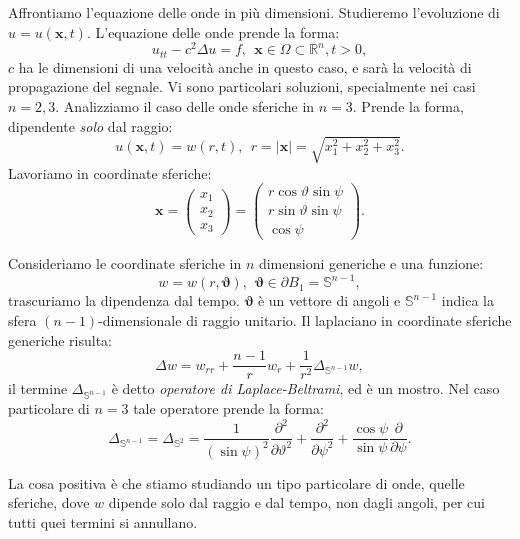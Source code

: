 \documentclass[10pt,a4paper,twoside,openright]{book}
\newcommand{\x}{\mathbf{x}}
\begin{document}
Affrontiamo l'equazione delle onde in più dimensioni. Studieremo l'evoluzione di $u=u(\x ,t)$. L'equazione delle onde prende la forma:
\begin{equation}
	u_{tt} -c^{2} \Delta u=f,\ \ \x \in \Omega \subset \mathbb{R}^{n} ,t >0,
\end{equation}
$c$ ha le dimensioni di una velocità anche in questo caso, e sarà la velocità di propagazione del segnale. Vi sono particolari soluzioni, specialmente nei casi $n=2,3$. Analizziamo il caso delle onde sferiche in $n=3$. Prende la forma, dipendente \textit{solo} dal raggio:
\begin{equation*}
	u(\x ,t) =w( r,t) ,\ \ r=| \x| =\sqrt{x_{1}^{2} +x_{2}^{2} +x_{3}^{2}} .
\end{equation*}
Lavoriamo in coordinate sferiche:
\begin{equation*}
	\x =
	\begin{pmatrix}
		x_{1} \\
		x_{2} \\
		x_{3} 
	\end{pmatrix} =
	\begin{pmatrix}
		r\cos \vartheta \sin \psi \\
		r\sin \vartheta \sin \psi \\
		\cos \psi                 
	\end{pmatrix} .
\end{equation*}
\begin{nb}
	Consideriamo le coordinate sferiche in $n$ dimensioni generiche e una funzione:
	\begin{equation*}
		w=w( r,\bm{\vartheta }) ,\ \ \bm{\vartheta } \in \partial B_{1} =\mathbb{S}^{n-1} ,
	\end{equation*}
	trascuriamo la dipendenza dal tempo. $\bm{\vartheta }$ è un vettore di angoli e $\mathbb{S}^{n-1}$ indica la sfera $( n-1)$-dimensionale di raggio unitario. Il laplaciano in coordinate sferiche generiche risulta:
	\begin{equation}
		\Delta w=w_{rr} +\frac{n-1}{r} w_{r} +\frac{1}{r^{2}} \Delta _{\mathbb{S}^{n-1}} w,
	\end{equation}
	il termine $\Delta _{\mathbb{S}^{n-1}}$ è detto \textit{operatore di Laplace-Beltrami}, ed è un mostro. Nel caso particolare di $n=3$ tale operatore prende la forma:
	\begin{equation}
		\Delta _{\mathbb{S}^{n-1}} =\Delta _{\mathbb{S}^{2}} =\frac{1}{(\sin \psi )^{2}}\frac{\partial ^{2}}{\partial \vartheta ^{2}} +\frac{\partial ^{2}}{\partial \psi ^{2}} +\frac{\cos \psi }{\sin \psi }\frac{\partial }{\partial \psi } .
	\end{equation}
\end{nb}
La cosa positiva è che stiamo studiando un tipo particolare di onde, quelle sferiche, dove $w$ dipende solo dal raggio e dal tempo, non dagli angoli, per cui tutti quei termini si annullano.
\end{document}

